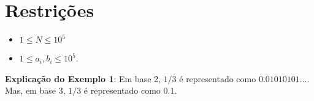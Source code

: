 
\section*{Restrições}

\begin{itemize}
\item $1 \leq N \leq 10^5$
\item $1 \leq a_i, b_i \leq 10^5$.
\end{itemize}

\exemplo

\bigskip
\textbf{Explicação do Exemplo 1}: Em base 2, $1/3$ é representado como $0.01010101...$. Mas, em base 3, $1/3$ é representado como $0.1$.
